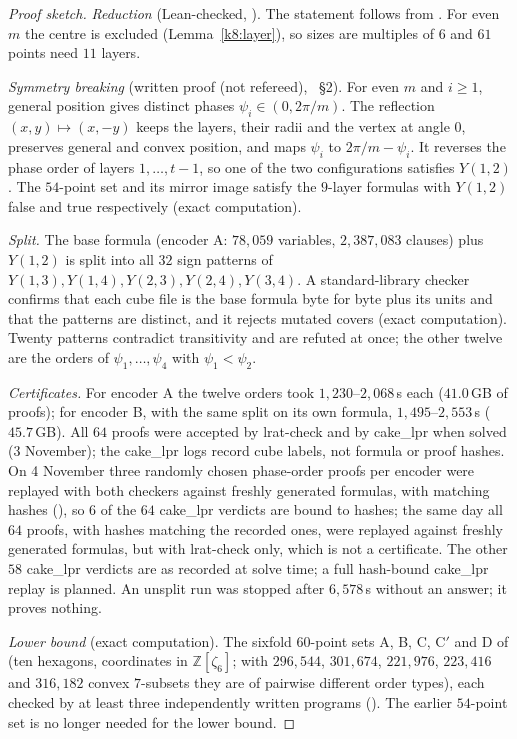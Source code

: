 \begin{proof}[Proof sketch]
\emph{Reduction} (Lean-checked, ). The statement follows from . For even $m$ the
centre is excluded (Lemma~\ref{k8:layer}), so sizes are multiples of $6$ and $61$ points need $11$ layers.

\emph{Symmetry breaking} (written proof (not refereed), ~\S2). For even $m$ and $i\ge1$, general position
gives distinct phases $\psi_i\in(0,2\pi/m)$. The reflection $(x,y)\mapsto(x,-y)$ keeps the layers, their radii and the
vertex at angle $0$, preserves general and convex position, and maps $\psi_i$ to $2\pi/m-\psi_i$. It reverses the phase
order of layers $1,\dots,t-1$, so one of the two configurations satisfies $Y(1,2)$. The $54$-point set and its mirror
image satisfy the $9$-layer formulas with $Y(1,2)$ false and true respectively (exact computation).

\emph{Split.} The base formula (encoder A: $78{,}059$ variables, $2{,}387{,}083$ clauses) plus $Y(1,2)$ is split into
all $32$ sign patterns of $Y(1,3),Y(1,4),Y(2,3),Y(2,4),Y(3,4)$. A standard-library checker confirms that each cube file
is the base formula byte for byte plus its units and that the patterns are distinct, and it rejects mutated covers
(exact computation). Twenty patterns contradict transitivity and are refuted at once; the other twelve are the orders of
$\psi_1,\dots,\psi_4$ with $\psi_1<\psi_2$.

\emph{Certificates.} For encoder A the twelve orders took $1{,}230$--$2{,}068$\,s each ($41.0$\,GB of proofs); for
encoder B, with the same split on its own formula, $1{,}495$--$2{,}553$\,s ($45.7$\,GB). All $64$ proofs were accepted
by lrat-check and by cake\_lpr when solved (3 November); the cake\_lpr logs record cube labels, not formula or proof
hashes. On 4 November three randomly chosen phase-order proofs per encoder were replayed with both checkers against
freshly generated formulas, with matching hashes (), so $6$ of the $64$ cake\_lpr verdicts are bound
to hashes; the same day all $64$ proofs, with hashes matching the recorded ones, were replayed against freshly generated
formulas, but with lrat-check only, which is not a certificate. The other $58$ cake\_lpr verdicts are as recorded at solve time; a full
hash-bound cake\_lpr replay is planned. An unsplit run was stopped after $6{,}578$\,s without an answer; it proves
nothing.

\emph{Lower bound} (exact computation). The sixfold $60$-point sets A, B, C, C$'$ and D of  (ten
hexagons, coordinates in $\mathbb{Z}[\zeta_6]$; with $296{,}544$, $301{,}674$, $221{,}976$, $223{,}416$ and $316{,}182$
convex $7$-subsets they are of pairwise different order types), each checked by at least three independently written
programs (). The earlier $54$-point set  is no longer needed for the lower bound.
\end{proof}

